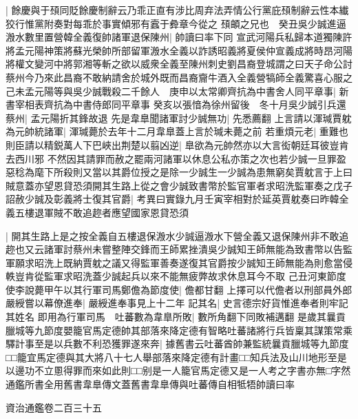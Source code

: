 |{
	餘慶與于䪹同貶餘慶制辭云乃乖正直有涉比周弃法弄情公行黨庇䪹制辭云性本纎狡行惟黨附奏對每乖於事實傾邪有蠧于彜章今從之}
䪹頔之兄也　癸丑吳少誠進逼溵水數里置營韓全義復帥諸軍退保陳州|{
	帥讀曰率下同}
宣武河陽兵私歸本道獨陳許將孟元陽神策將蘇光榮帥所部留軍溵水全義以詐誘昭義將夏侯仲宣義成將時昂河陽將權文變河中將郭湘等斬之欲以威衆全義至陳州刺史劉昌裔登城謂之曰天子命公討蔡州今乃來此昌裔不敢納請舍於城外既而昌裔齎牛酒入全義營犒師全義驚喜心服之己未孟元陽等與吳少誠戰殺二千餘人　庚申以太常卿齊抗為中書舍人同平章事|{
	新書宰相表齊抗為中書侍郎同平章事}
癸亥以張愔為徐州留後　冬十月吳少誠引兵還蔡州|{
	孟元陽折其鋒故退}
先是韋臯聞諸軍討少誠無功|{
	先悉薦翻}
上言請以渾瑊賈躭為元帥統諸軍|{
	渾瑊薨於去年十二月韋臯蓋上言於瑊未薨之前}
若重煩元老|{
	重難也}
則臣請以精鋭萬人下巴峽出荆楚以翦凶逆|{
	臯欲為元帥然亦以大言衒朝廷耳彼豈肯去西川邪}
不然因其請罪而赦之罷兩河諸軍以休息公私亦策之次也若少誠一旦罪盈惡稔為麾下所殺則又當以其爵位授之是除一少誠生一少誠為患無窮矣賈躭言于上曰賊意蓋亦望恩貸恐須開其生路上從之會少誠致書幣於監官軍者求昭洗監軍奏之戊子詔赦少誠及彰義將士復其官爵|{
	考異曰實錄九月壬寅宰相對於延英賈躭奏曰昨韓全義五樓退軍賊不敢追趂者應望國家恩貸恐須}


|{
	開其生路上是之按全義自五樓退保溵水少誠逼溵水下營全義又退保陳州非不敢追趂也又云諸軍討蔡州未嘗整陣交鋒而王師累挫潰吳少誠知王師無能為致書幣以告監軍願求昭洗上既納賈躭之議又得監軍善奏遂復其官爵按少誠知王師無能為則愈當侵軼豈肯從監軍求昭洗蓋少誠起兵以來不能無疲弊故求休息耳今不取}
己丑河東節度使李說薨甲午以其行軍司馬鄭儋為節度使|{
	儋都甘翻}
上擇可以代儋者以刑部員外郎嚴綬嘗以幕僚進奉|{
	嚴綬進奉事見上十二年}
記其名|{
	史言德宗好貨惟進奉者則牢記其姓名}
即用為行軍司馬　吐蕃數為韋臯所敗|{
	數所角翻下同敗補邁翻}
是歲其曩貢臘城等九節度嬰籠官馬定德帥其部落來降定德有智略吐蕃諸將行兵皆稟其謀策常乘驛計事至是以兵數不利恐獲罪遂來奔|{
	據舊書云吐蕃酋帥兼監統曩貢臘城等九節度□□籠宜馬定德與其大將八十七人舉部落來降定德有計畫□□知兵法及山川地形至是以邊功不立慁得罪而來如此則□□别是一人籠官馬定德又是一人考之字書亦無□字然通鑑所書全用舊書韋臯傳文蓋舊書韋臯傳與吐蕃傳自相牴牾帥讀曰率}


資治通鑑卷二百三十五
